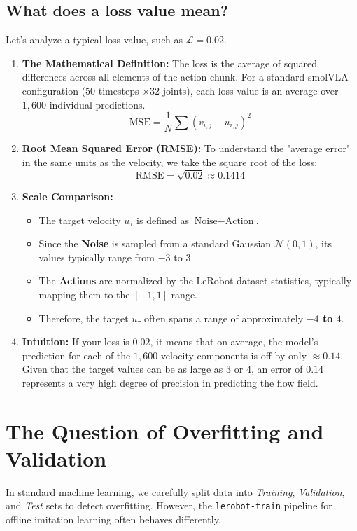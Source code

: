 \documentclass[11pt,a4paper]{article}
\begin{document}
\subsection{What does a loss value mean?}
Let's analyze a typical loss value, such as $\mathcal{L} = 0.02$.

\begin{enumerate}
    \item \textbf{The Mathematical Definition:} The loss is the average of squared differences across all elements of the action chunk. For a standard smolVLA configuration ($50$ timesteps $\times 32$ joints), each loss value is an average over $1,600$ individual predictions.
    \[ \text{MSE} = \frac{1}{N} \sum (v_{i,j} - u_{i,j})^2 \]
    
    \item \textbf{Root Mean Squared Error (RMSE):} To understand the "average error" in the same units as the velocity, we take the square root of the loss:
    \[ \text{RMSE} = \sqrt{0.02} \approx 0.1414 \]
    
    \item \textbf{Scale Comparison:} 
    \begin{itemize}
        \item The target velocity $u_\tau$ is defined as $\text{Noise} - \text{Action}$. 
        \item Since the \textbf{Noise} is sampled from a standard Gaussian $\mathcal{N}(0, 1)$, its values typically range from $-3$ to $3$.
        \item The \textbf{Actions} are normalized by the LeRobot dataset statistics, typically mapping them to the $[-1, 1]$ range.
        \item Therefore, the target $u_\tau$ often spans a range of approximately \textbf{$-4$ to $4$}.
    \end{itemize}
    
    \item \textbf{Intuition:} If your loss is $0.02$, it means that on average, the model's prediction for each of the $1,600$ velocity components is off by only \textbf{$\approx 0.14$}. Given that the target values can be as large as $3$ or $4$, an error of $0.14$ represents a very high degree of precision in predicting the flow field.
\end{enumerate}

\section{The Question of Overfitting and Validation}
In standard machine learning, we carefully split data into \textit{Training}, \textit{Validation}, and \textit{Test} sets to detect overfitting. However, the \texttt{lerobot-train} pipeline for offline imitation learning often behaves differently.
\end{document}
